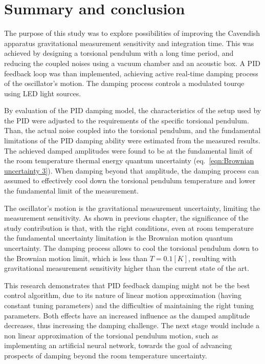 \documentclass[\main/master.tex]{subfiles}
\begin{document}
\newspacing
\chapter{Summary and conclusion}\label{chapter:Summary and conclusion}
The purpose of this study was to explore possibilities of improving the Cavendish apparatus gravitational measurement sensitivity and integration time. This was achieved by designing a torsional pendulum with a long time period, and reducing the coupled noises using a vacuum chamber and an acoustic box. A PID feedback loop was than implemented, achieving active real-time damping process of the oscillator's motion. The damping process controls a modulated tourqe using LED light sources. 
\par\noindent
By evaluation of the PID damping model, the characteristics of the setup used by the PID were adjusted to the requirements of the specific torsional pendulum. Than, the actual noise coupled into the torsional pendulum, and the fundamental limitations of the PID damping ability were estimated from the measured results. The achieved damped amplitudes were found to be at the fundamental limit of the room temperature thermal energy quantum uncertainty (eq.~\ref{eqn:Brownian uncertainty 3}). When damping beyond that amplitude, the damping process can assumed to effectively cool down the torsional pendulum temperature and lower the fundamental limit of the measurement. 
\par\noindent
The oscillator's motion is the gravitational measurement uncertainty, limiting the measurement sensitivity. As shown in previous chapter, the significance of the study contribution is that, with the right conditions, even at room temperature the fundamental uncertainty limitation is the Brownian motion quantum uncertainty. The damping process allows to cool the torsional pendulum down to the Brownian motion limit, which is less than $T=0.1[K]$, resulting with gravitational measurement sensitivity higher than the current state of the art. 
\par\noindent
This research demonstrates that PID feedback damping might not be the best control algorithm, due to its nature of linear motion approximation (having constant tuning parameters) and the difficulties of maintaining the right tuning parameters. Both effects have an increased influence as the damped amplitude decreases, thus increasing the damping challenge. The next stage would include a non linear approximation of the torsional pendulum motion, such as implementing an artificial neural network, towards the goal of advancing prospects of damping beyond the room temperature uncertainty. 
\end{document}
